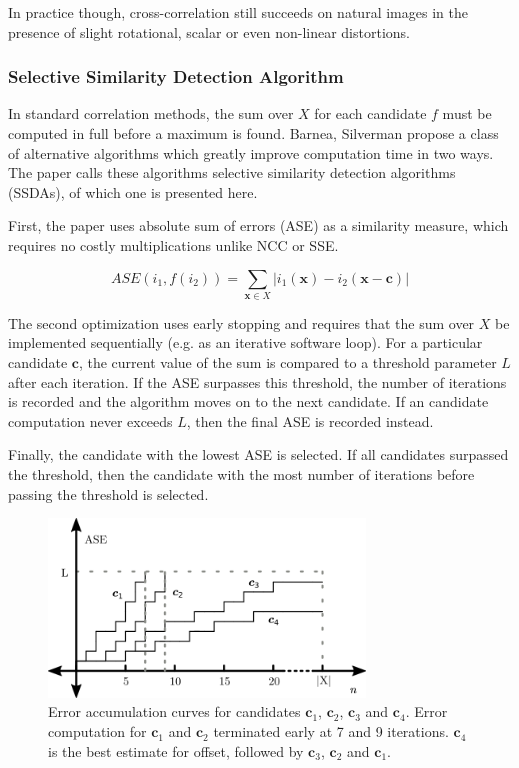 \documentclass[tocnosub,noragright,centerchapter,12pt]{uiucecethesis09}
\begin{document}
In practice though, cross-correlation still succeeds on natural images in the presence of slight rotational, scalar or even non-linear distortions.

\subsubsection{Selective Similarity Detection Algorithm}

In standard correlation methods, the sum over $X$ for each candidate $f$ must be computed in full before a maximum is found.  Barnea, Silverman \cite{barnea} propose a class of alternative algorithms which greatly improve computation time in two ways.  The paper calls these algorithms selective similarity detection algorithms (SSDAs), of which one is presented here.

First, the paper uses absolute sum of errors (ASE) as a similarity measure, which requires no costly multiplications unlike NCC or SSE.

$$
ASE(i_1, f(i_2)) = \sum_{\bm{x} \in X} |i_1(\bm{x}) - i_2(\bm{x} - \bm{c})|
$$

The second optimization uses early stopping and requires that the sum over $X$ be implemented sequentially (e.g. as an iterative software loop).  For a particular candidate $\bm{c}$, the current value of the sum is compared to a threshold parameter $L$ after each iteration.  If the ASE surpasses this threshold, the number of iterations is recorded and the algorithm moves on to the next candidate.  If an candidate computation never exceeds $L$, then the final ASE is recorded instead.

Finally, the candidate with the lowest ASE is selected.  If all candidates surpassed the threshold, then the candidate with the most number of iterations before passing the threshold is selected.

\begin{figure}
  \centering
  \includegraphics[width=0.75\textwidth]{figures/ssda.png}
  \caption{
    Error accumulation curves for candidates $\bm{c}_1$, $\bm{c}_2$, $\bm{c}_3$ and $\bm{c}_4$.  Error computation for $\bm{c}_1$ and $\bm{c}_2$ terminated early at 7 and 9 iterations.  $\bm{c}_4$ is the best estimate for offset, followed by $\bm{c}_3$, $\bm{c}_2$ and $\bm{c}_1$.
  }
\end{figure}
\end{document}
